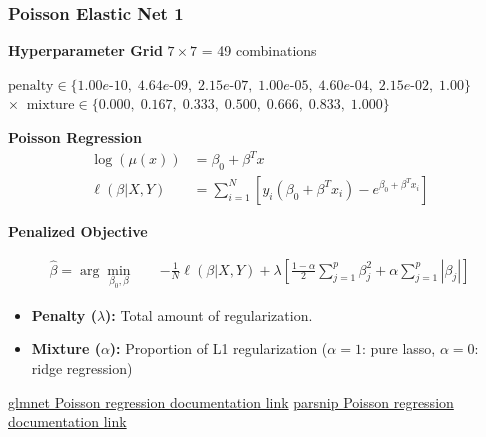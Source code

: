 \documentclass[aspectratio=1610, 9pt]{beamer}
\begin{document}
\begin{frame}
    \frametitle{Poisson Elastic Net 1}

    \footnotesize

    \textbf{Hyperparameter Grid} $7 \times 7$ = 49 combinations

    {\scriptsize\centering
      $\text{penalty} \in \{1.00e\text{-}10,\; 4.64e\text{-}09,\; 2.15e\text{-}07,\;
      1.00e\text{-}05,\; 4.60e\text{-}04,\; 2.15e\text{-}02,\; 1.00\}$\\[2pt]
      $\times\;\; \text{mixture} \in \{0.000,\; 0.167,\; 0.333,\; 0.500,\; 0.666,\; 0.833,\; 1.000\}$\par
    }

    \textbf{Poisson Regression}
    \vspace{-.2cm}
    \begin{align*}
        \log(\mu(x)) &= \beta_0 + \beta^T x\\
        \ell(\beta|X,Y) &= \sum_{i=1}^N
        \left[
        y_i(\beta_0+\beta^Tx_i)
        - e^{\beta_0+\beta^Tx_i}
        \right]
    \end{align*}

    \vspace{-0.2cm}

    \textbf{Penalized Objective}

    \vspace{-0.1cm}

    \footnotesize
    \[
    \begin{aligned}
    \hat{\beta} = \arg\min_{\beta_0,\beta}
    \quad &-\frac{1}{N}\ell(\beta|X,Y) +\lambda\left[
    \frac{1-\alpha}{2}\sum_{j=1}^p\beta_j^2
    +\alpha\sum_{j=1}^p|\beta_j|
    \right]
    \end{aligned}
    \]

    \vspace{-0.3cm}

    \begin{itemize}
        \item \textbf{Penalty ($\lambda$):} Total amount of regularization.
        \item \textbf{Mixture ($\alpha$):} Proportion of L1 regularization
              ($\alpha=1$: pure lasso, $\alpha=0$: ridge regression)
    \end{itemize}

    \vfill

    \tiny
    \href{https://glmnet.stanford.edu/articles/glmnet.html\#poisson-regression-family-poisson}{glmnet Poisson regression documentation link}
    \quad
    \href{https://parsnip.tidymodels.org/reference/poisson_reg.html}{parsnip Poisson regression documentation link}

\end{frame}
\end{document}
